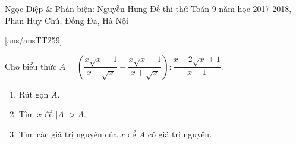 \begin{name}
{Ngọc Diệp \& Phản biện: Nguyễn Hưng}
{Đề thi thử Toán 9 năm học 2017-2018, Phan Huy Chú, Đống Đa, Hà Nội }
\end{name}
\setcounter{ex}{0}
[ans/ansTT259]

\begin{ex}%
	Cho biểu thức $A=\left( \dfrac{x \sqrt{x} -1}{x-\sqrt{x}} - \dfrac{x\sqrt{x} +1}{x+\sqrt{x}}\right) : \dfrac{x-2\sqrt{x} +1}{x-1} .$
		\begin{enumerate}
		\item Rút gọn $A$.
		\item Tìm $x$ để $\left| A\right| >A$.
		\item Tìm các giá trị nguyên của $x$ để $A$ có giá trị nguyên.
	\end{enumerate}
\end{ex}
